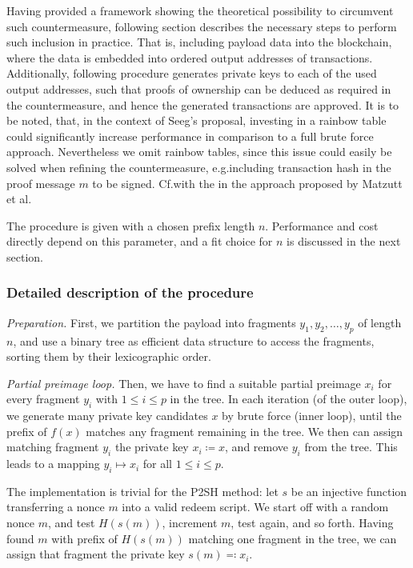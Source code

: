 \documentclass[a4paper,11pt,titlepage]{scrbook}
\begin{document}
Having provided a framework showing the theoretical possibility to circumvent such countermeasure, following section describes the necessary steps to perform such inclusion in practice.
That is, including payload data into the blockchain, where the data is embedded into ordered output addresses of transactions.
Additionally, following procedure generates private keys to each of the used output addresses, such that proofs of ownership can be deduced as required in the countermeasure, and hence the generated transactions are approved.
It is to be noted, that, in the context of Seeg's proposal, investing in a rainbow table could significantly increase performance in comparison to a full brute force approach.
Nevertheless we omit rainbow tables, since this issue could easily be solved when refining the countermeasure, e.g.\@ including transaction hash in the proof message $m$ to be signed.
Cf.\@ with the  in the approach proposed by Matzutt et al. \cite[368--369]{matzutt_thwarting_2018}

The procedure is given with a chosen prefix length $n$. Performance and cost directly depend on this parameter, and a fit choice for $n$ is discussed in the next section.

\subsubsection*{Detailed description of the procedure}

\emph{Preparation.} First, we partition the payload into fragments $y_1, y_2, \dots, y_p$ of length $n$, and use a binary tree as efficient data structure to access the fragments, sorting them by their lexicographic order.

\emph{Partial preimage loop.} 
Then, we have to find a suitable partial preimage $x_i$ for every fragment $y_i$ with $1\leq i \leq p$ in the tree.
In each iteration (of the outer loop), we generate many private key candidates $x$ by brute force (inner loop), until the prefix of $f(x)$ matches any fragment remaining in the tree.
We then can assign matching fragment $y_i$ the private key $x_i \coloneqq x$, and remove $y_i$ from the tree.
This leads to a mapping $y_i \mapsto x_i$ for all $1\leq i\leq p$.

The implementation is trivial for the P2SH method: let $s$ be an injective function transferring a nonce $m$ into a valid redeem script.
We start off with a random nonce $m$, and test $H(s(m))$, increment $m$, test again, and so forth.
Having found $m$ with prefix of $H(s(m))$ matching one fragment in the tree, we can assign that fragment the private key $s(m)\eqqcolon x_i$.
\end{document}
